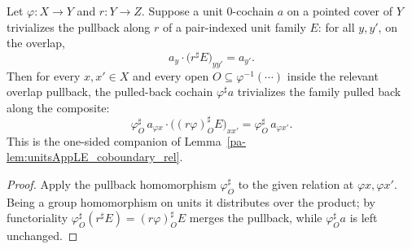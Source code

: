 \begin{lemma}
  \label{pa-lem:unitsAppLE_trivializing_rel}
  \leanok

  Let \(\varphi \colon X \to Y\) and \(r \colon Y \to Z\). Suppose a unit \(0\)-cochain \(a\) on a
  pointed cover of \(Y\) trivializes the pullback along \(r\) of a pair-indexed unit family \(E\):
  for all \(y, y'\), on the overlap,
  \[
    a_y \cdot \bigl(r^{\sharp} E\bigr)_{y y'} = a_{y'} .
  \]
  Then for every \(x, x' \in X\) and every open \(O \subseteq \varphi^{-1}(\cdots)\) inside the
  relevant overlap pullback, the pulled-back cochain \(\varphi^{\sharp} a\) trivializes the family
  pulled back along the composite:
  \[
    \varphi^{\sharp}_O\, a_{\varphi x} \cdot \bigl((r\varphi)^{\sharp}_O E\bigr)_{x x'}
      = \varphi^{\sharp}_O\, a_{\varphi x'} .
  \]
  This is the one-sided companion of Lemma~\ref{pa-lem:unitsAppLE_coboundary_rel}.
\end{lemma}
\begin{proof}
  \leanok
  Apply the pullback homomorphism \(\varphi^{\sharp}_O\) to the given relation at \(\varphi x,
  \varphi x'\). Being a group homomorphism on units it distributes over the product; by
  functoriality \(\varphi^{\sharp}_O(r^{\sharp} E) = (r\varphi)^{\sharp}_O E\) merges the pullback,
  while \(\varphi^{\sharp}_O a\) is left unchanged.
\end{proof}

